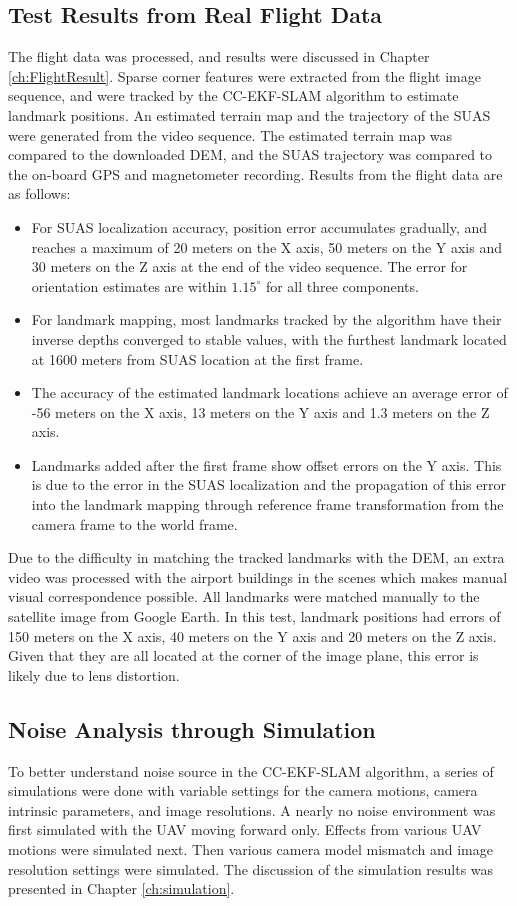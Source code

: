 \subsection{Test Results from Real Flight Data}
The flight data was processed, and results were discussed in Chapter
\ref{ch:FlightResult}. Sparse corner features were extracted from the
flight image sequence, and were tracked by the CC-EKF-SLAM algorithm
to estimate landmark positions. An estimated terrain map and the
trajectory of the SUAS were generated from the video sequence. The
estimated terrain map was compared to the downloaded DEM, and the SUAS
trajectory was compared to the on-board GPS and magnetometer
recording. Results from the flight data are as follows:
\begin{itemize}
  \item For SUAS localization accuracy, position error accumulates
  gradually, and reaches a maximum of 20 meters on the X axis, 50 meters
  on the Y axis and 30 meters on the Z axis at the end of the video sequence.
  The error for orientation estimates are within $1.15^\circ$ for all
  three components.
  \item For landmark mapping, most landmarks tracked by the
  algorithm have their inverse depths converged to stable values, with the
  furthest landmark located at 1600 meters from SUAS location at the
  first frame.
  \item The accuracy of the estimated landmark locations achieve an
  average error of -56 meters on the X axis, 13 meters on the Y axis
  and 1.3 meters on the Z axis.
  \item Landmarks added after the first frame show offset errors on
  the Y axis. This is due to the error in the SUAS localization and
  the propagation of this error into the landmark mapping through
  reference frame transformation from the camera frame to the world
  frame.
\end{itemize}

Due to the difficulty in matching the tracked landmarks with the DEM,
an extra video was processed with the airport buildings in the scenes
which makes manual visual correspondence possible. All landmarks were
matched manually to the satellite image from Google Earth. In this
test, landmark positions had errors of 150 meters on the X axis, 40
meters on the Y axis and 20 meters on the Z axis. Given that they are
all located at the corner of the image plane, this error is likely due
to lens distortion.

\subsection{Noise Analysis through Simulation}
To better understand noise source in the CC-EKF-SLAM algorithm, a series
of simulations were done with variable settings for the camera
motions, camera intrinsic parameters, and image resolutions. A nearly
no noise environment was first simulated with the UAV moving forward only.
Effects from various UAV motions were simulated next. Then
various camera model mismatch and image resolution settings were
simulated. The discussion of the simulation results was presented in
Chapter \ref{ch:simulation}.

